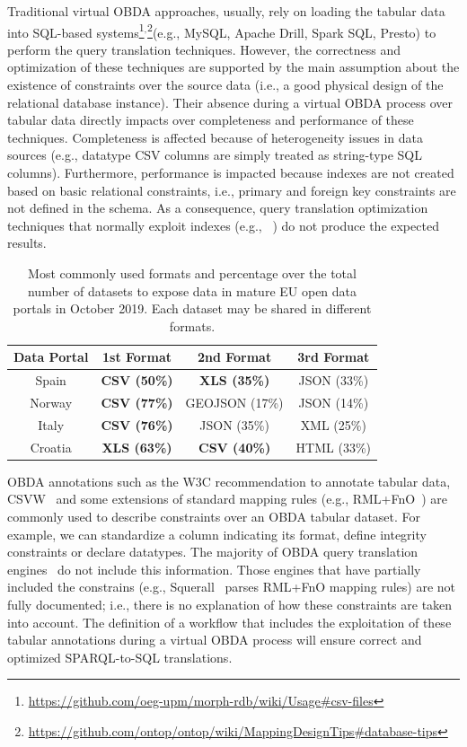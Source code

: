 Traditional virtual OBDA approaches, usually, rely on loading the tabular data into SQL-based systems\footnote{\url{https://github.com/oeg-upm/morph-rdb/wiki/Usage\#csv-files}}$^,$\footnote{\url{https://github.com/ontop/ontop/wiki/MappingDesignTips\#database-tips}}(e.g., MySQL, Apache Drill, Spark SQL, Presto) to perform the query translation techniques. However, the correctness and optimization of these techniques are supported by the main assumption about the existence of constraints over the source data (i.e., a good physical design of the relational database instance). Their absence during a virtual OBDA process over tabular data directly impacts over completeness and performance of these techniques. Completeness is affected because of heterogeneity issues in data sources (e.g., datatype CSV columns are simply treated as string-type SQL columns). Furthermore, performance is impacted because indexes are not created based on basic relational constraints, i.e., primary and foreign key constraints are not defined in the schema. As a consequence, query translation optimization techniques that normally exploit indexes (e.g., ~\citep{rodriguez2015efficient,priyatna2014formalisation}) do not produce the expected results.
\begin{table}[t]
\centering
\caption{Most commonly used formats and percentage over the total number of datasets to expose data in mature EU open data portals in October 2019. Each dataset may be shared in different formats.}
\label{tab:odp}
\begin{tabular}{c|c|c|c}
\hline
\textbf{Data Portal} & \textbf{1st Format}  & \textbf{2nd Format} & \textbf{3rd Format} \\ \hline
Spain                & \textbf{CSV (50\%)}  & \textbf{XLS (35\%)}  & JSON (33\%)          \\ 
Norway               & \textbf{CSV (77\%)}    & GEOJSON (17\%)         & JSON (14\%)            \\ 
Italy               & \textbf{CSV (76\%)}  & JSON (35\%)          & XML (25\%)           \\ 
Croatia              & \textbf{XLS (63\%)}    & \textbf{CSV (40\%)}   & HTML (33\%)           \\ \hline
\end{tabular}
\end{table}

OBDA annotations such as the W3C recommendation to annotate tabular data, CSVW~\citep{tennison2015model} and some extensions of standard mapping rules (e.g., RML+FnO~\citep{de2017declarative}) are commonly used to describe constraints over an OBDA tabular dataset. For example, we can standardize a column indicating its format, define integrity constraints or declare datatypes. The majority of OBDA query translation engines~\citep{priyatna2014formalisation,endris2019ontario} do not include this information. Those engines that have partially included the constrains (e.g., Squerall~\citep{mami2019squerall} parses RML+FnO mapping rules) are not fully documented; i.e., there is no explanation of how these constraints are taken into account. The definition of a workflow that includes the exploitation of these tabular annotations during a virtual OBDA process will ensure correct and optimized SPARQL-to-SQL translations.

